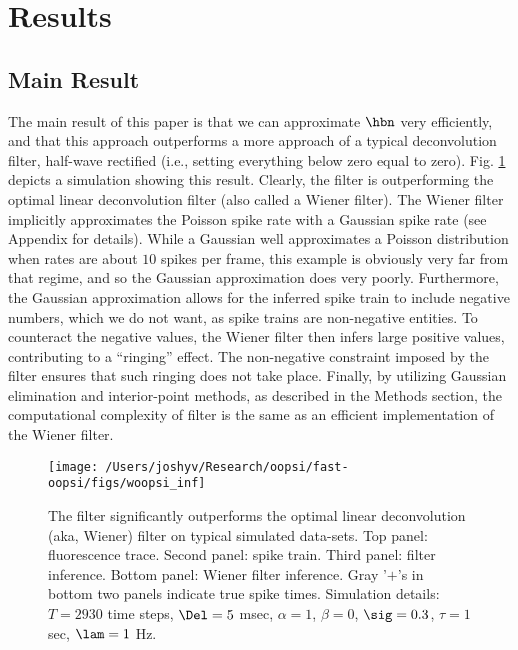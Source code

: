 \section{Results} \label{sec:results}

\subsection{Main Result} \label{sec:main}

The main result of this paper is that we can approximate $\hbn$ very efficiently, and that this approach outperforms a more \naive approach of a typical deconvolution filter, half-wave rectified (i.e., setting everything below zero equal to zero).  Fig. \ref{fig:woopsi_inf} depicts a simulation showing this result. Clearly, the \foopsi filter is outperforming the optimal linear deconvolution filter (also called a Wiener filter).  The Wiener filter implicitly approximates the Poisson spike rate with a Gaussian spike rate (see Appendix for details). While a Gaussian well approximates a Poisson distribution when rates are about $10$ spikes per frame, this example is obviously very far from that regime, and so the Gaussian approximation does very poorly. Furthermore, the Gaussian approximation allows for the inferred spike train to include negative numbers, which we do not want, as spike trains are non-negative entities.  To counteract the negative values, the Wiener filter then infers large positive values, contributing to a ``ringing'' effect.  The non-negative constraint imposed by the \foopsi filter ensures that such ringing does not take place.  Finally, by utilizing Gaussian elimination and interior-point methods, as described in the Methods section, the computational complexity of \foopsi filter is the same as an efficient implementation of the Wiener filter.  


\begin{figure}[h!]
\centering \texttt{[image: /Users/joshyv/Research/oopsi/fast-oopsi/figs/woopsi\_inf]}
\caption[\foopsi filter outperforms Wiener filter]{The \foopsi filter significantly outperforms the optimal linear deconvolution (aka, Wiener) filter on typical simulated data-sets. Top panel: fluorescence trace.  Second panel: spike train.  Third panel: \foopsi filter inference.  Bottom panel: Wiener filter inference.  Gray '$+$'s in bottom two panels indicate true spike times.  Simulation details: $T=2930$ time steps, $\Del=5$ msec, $\alpha=1$, $\beta=0$, $\sig=0.3$, $\tau=1$ sec, $\lam=1$ Hz.} \label{fig:woopsi_inf}
\end{figure}



